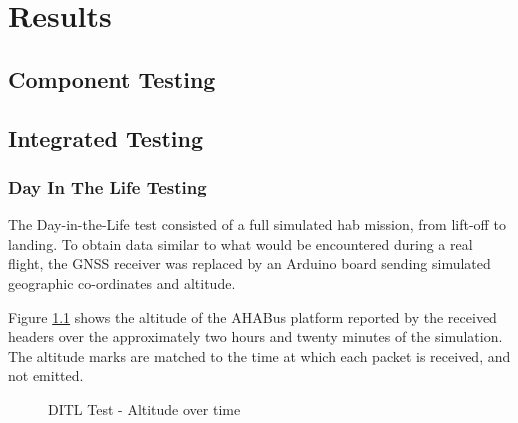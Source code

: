 \chapter{Results}
\label{ch:results}

\section{Component Testing}

\section{Integrated Testing}

\subsection{Day In The Life Testing}

The Day-in-the-Life test consisted of a full simulated \acrlong{hab} mission,
from lift-off to landing. To obtain data similar to what would be encountered
during a real flight, the GNSS receiver was replaced by an Arduino board 
sending simulated geographic co-ordinates and altitude.

Figure \ref{fig:dit-alt} shows the altitude of the AHABus platform reported by
the received headers over the approximately two hours and twenty minutes of the
simulation. The altitude marks are matched to the time at which each packet
is received, and not emitted.

\begin{figure}[H]
\centering
\caption{DITL Test - Altitude over time}
\label{fig:dit-alt}
\end{figure}

%


